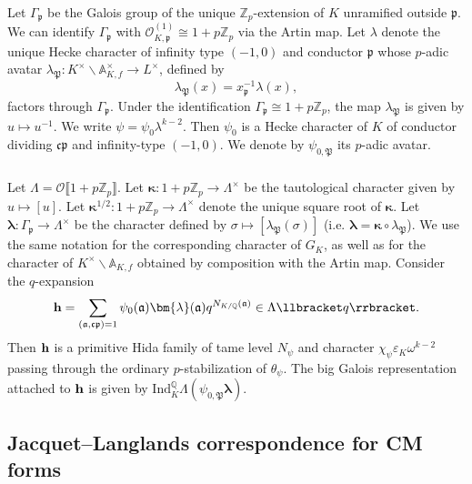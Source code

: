 \documentclass{amsart}
\numberwithin{equation}{section}
\newcommand{\bb}{\mathbb}
\newcommand{\frk}{\mathfrak}
\newcommand{\Ind}{\mathrm{Ind}}
\newcommand{\h}{\textup{\bf h}}
\newcommand{\hh}{\h}
\begin{document}
\subsubsection{} Let $\Gamma_{\frk{p}}$ be the Galois group of the unique $\bb{Z}_p$-extension of $K$ unramified outside $\frk{p}$. We can identify $\Gamma_{\frk{p}}$ with $\mathcal{O}_{K,\frk{p}}^{(1)}\cong 1+p\bb{Z}_p$ via the Artin map. Let $\lambda$ denote the unique Hecke character of infinity type $(-1,0)$ and conductor $\frk{p}$ whose $p$-adic avatar $\lambda_\mathfrak{P}:K^\times\backslash \bb{A}_{K,f}^{\times}\rightarrow L^\times$, defined by
\[
\lambda_{\frk{P}}(x)=x_{\frk{p}}^{-1} \lambda(x),
\]
factors through $\Gamma_\frk{p}$. Under the identification $\Gamma_{\frk{p}}\cong 1+p\bb{Z}_p$, the map $\lambda_{\frk{P}}$ is given by $u\mapsto u^{-1}$. We write $\psi=\psi_0 \lambda^{k-2}$. Then $\psi_0$ is a Hecke character of $K$ of conductor dividing $\frk{cp}$ and infinity-type $(-1,0)$. We denote by $\psi_{0,\frk{P}}$ its $p$-adic avatar. 
\vspace{-0.2cm}
\subsubsection{} Let $\Lambda=\mathcal{O}\llbracket1+p\bb{Z}_p\rrbracket$. Let $\bm{\kappa}:1+p\bb{Z}_p\rightarrow \Lambda^\times$ be the tautological character given by $u\mapsto [u]$. Let $\bm{\kappa}^{1/2}:1+p\bb{Z}_p\rightarrow \Lambda^\times$ denote the unique square root of $\bm{\kappa}$. Let $\bm{\lambda}:\Gamma_{\frk{p}}\rightarrow \Lambda^\times$ be the character defined by $\sigma\mapsto [\lambda_{\frk{P}}(\sigma)]$ (i.e. $\bm{\lambda}=\bm{\kappa}\circ\lambda_{\frk{P}}$). We use the same notation for the corresponding character of $G_K$, as well as for the character of $K^\times\backslash \bb{A}_{K,f}$ obtained by composition with the Artin map. Consider the $q$-expansion
\[
\hh = \sum_{(\frk{a},\frk{cp})=1}\psi_0(\frk{a})\bm{\lambda}(\frk{a})q^{N_{K/\bb{Q}}(\frk{a})}\in \Lambda\llbracket q\rrbracket.
\]
Then $\hh$ is a primitive Hida family of tame level $N_\psi$ and character $\chi_\psi\varepsilon_{K}\omega^{k-2}$ passing through the ordinary $p$-stabilization of $\theta_\psi$. The big Galois representation attached to $\hh$ is given by $\Ind_{K}^\bb{Q} \Lambda(\psi_{0,\frk{P}}\bm{\lambda})$.
\vspace{-0.2cm}

\subsection{Jacquet--Langlands correspondence for CM forms}
\end{document}

